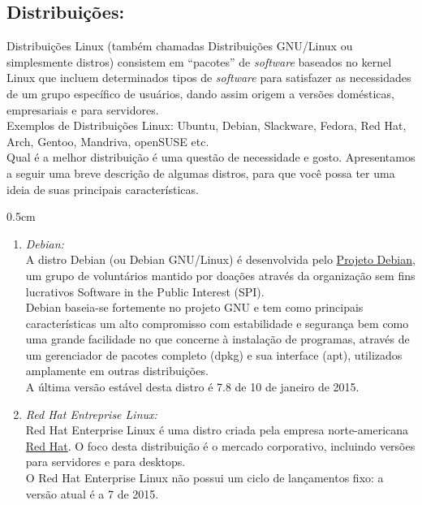 \begin{refsection}
\subsection{Distribuições:}\label{tut1:linux:dist}
Distribuições Linux (também chamadas Distribuições GNU/Linux ou simplesmente distros) consistem em ``pacotes'' de \textit{software} baseados no kernel Linux que incluem determinados tipos de \textit{software} para satisfazer as necessidades de um grupo específico de usuários, dando assim origem a versões domésticas, empresariais e para servidores.\\
Exemplos de Distribuições Linux: Ubuntu, Debian, Slackware, Fedora, Red Hat, Arch, Gentoo, Mandriva, openSUSE etc.\\
Qual é a melhor distribuição é uma questão de necessidade e gosto. Apresentamos a seguir uma breve descrição de algumas distros, para que você possa ter uma ideia de suas principais características.\\
\begin {myindentpar}{0.5cm}
\begin{enumerate}[\itshape i.]
 \item \textit{Debian:}\label{tut1:linux:dist:debian}\\
	A distro Debian (ou Debian GNU/Linux) é desenvolvida pelo \href{http://www.debian.org/distrib/}{Projeto Debian}, um grupo de voluntários mantido por doações através da organização sem fins lucrativos Software in the Public Interest (SPI).\\
	Debian baseia-se fortemente no projeto GNU e tem como principais características um alto compromisso com estabilidade e segurança bem como uma grande facilidade no que concerne à instalação de programas, através de um gerenciador de pacotes completo (dpkg) e sua interface (apt), utilizados amplamente em outras distribuições.\\
	A última versão estável desta distro é 7.8 de 10 de janeiro de 2015.\\
 \item \textit{Red Hat Entreprise Linux:}\label{tut1:linux:dist:redhat}\\
	Red Hat Enterprise Linux é uma distro criada pela empresa norte-americana \href{https://br.redhat.com/products/enterprise-linux/}{Red Hat}. O foco desta distribuição é o mercado corporativo, incluindo versões para servidores e para desktops.\\
	O Red Hat Enterprise Linux não possui um ciclo de lançamentos fixo: a versão atual é a 7 de 2015.\\

\end{enumerate}
\end{myindentpar}
\end{refsection}
